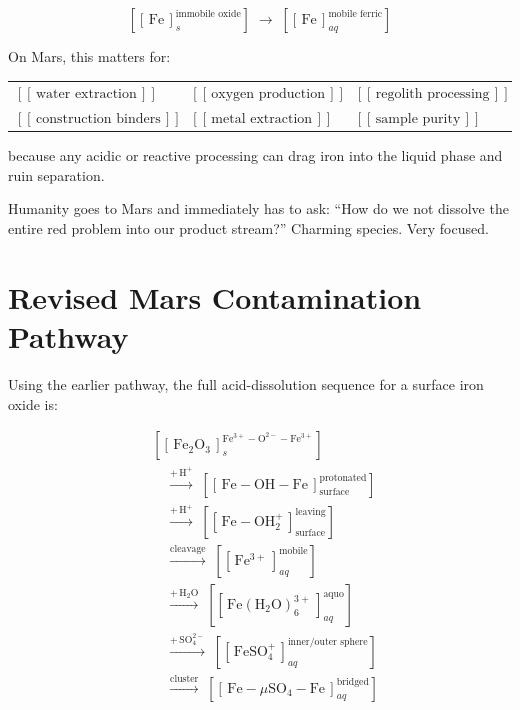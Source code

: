 \documentclass[11pt,a4paper]{article}
\newcommand{\cid}[3]{\!\left[\!\left[\,#1\,\right]^{\!#2}_{\!#3}\!\right]}
\newcommand{\cidn}[1]{\!\left[\!\left[\,#1\,\right]\!\right]}
\begin{document}
\begin{keybox}
\[
\cid{\mathrm{Fe}}{\text{immobile oxide}}{s}
\;\rightarrow\;
\cid{\mathrm{Fe}}{\text{mobile ferric}}{aq}
\]
\end{keybox}

On Mars, this matters for:

\begin{center}
\medskip
\begin{tabular}{@{}lll@{}}
$\cidn{\text{water extraction}}$   &
$\cidn{\text{oxygen production}}$  &
$\cidn{\text{regolith processing}}$\\[6pt]
$\cidn{\text{construction binders}}$ &
$\cidn{\text{metal extraction}}$   &
$\cidn{\text{sample purity}}$
\end{tabular}
\medskip
\end{center}

because any acidic or reactive processing can drag iron into the liquid phase
and ruin separation.

\begin{smlaw}
Humanity goes to Mars and immediately has to ask: ``How do we not dissolve
the entire red problem into our product stream?''
Charming species.  Very focused.
\end{smlaw}

\section{Revised Mars Contamination Pathway}

Using the earlier pathway, the full acid-dissolution sequence for a surface
iron oxide is:

\begin{align*}
&\cid{\mathrm{Fe_2O_3}}{\mathrm{Fe^{3+}{-}O^{2-}{-}Fe^{3+}}}{s}\\[8pt]
&\quad\xrightarrow{+\,\mathrm{H^+}}\;
  \cid{\mathrm{Fe{-}OH{-}Fe}}{\text{protonated}}{\text{surface}}\\[8pt]
&\quad\xrightarrow{+\,\mathrm{H^+}}\;
  \cid{\mathrm{Fe{-}OH_2^+}}{\text{leaving}}{\text{surface}}\\[8pt]
&\quad\xrightarrow{\text{cleavage}}\;
  \cid{\mathrm{Fe^{3+}}}{\text{mobile}}{aq}\\[8pt]
&\quad\xrightarrow{+\,\mathrm{H_2O}}\;
  \cid{\mathrm{Fe(H_2O)_6^{3+}}}{\text{aquo}}{aq}\\[8pt]
&\quad\xrightarrow{+\,\mathrm{SO_4^{2-}}}\;
  \cid{\mathrm{FeSO_4^+}}{\text{inner/outer sphere}}{aq}\\[8pt]
&\quad\xrightarrow{\text{cluster}}\;
  \cid{\mathrm{Fe{-}}\mu\mathrm{SO_4{-}Fe}}{\text{bridged}}{aq}
\end{align*}
\end{document}
